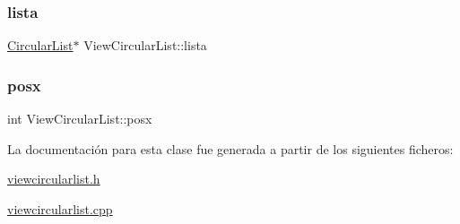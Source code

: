 \subsubsection{\texorpdfstring{lista}{lista}}
{\footnotesize\ttfamily \mbox{\hyperlink{class_circular_list}{Circular\+List}}$\ast$ View\+Circular\+List\+::lista}

\mbox{\label{class_view_circular_list_a9dca774f51b7b6bab8515b862774315f}} 
\subsubsection{\texorpdfstring{posx}{posx}}
{\footnotesize\ttfamily int View\+Circular\+List\+::posx}



La documentación para esta clase fue generada a partir de los siguientes ficheros\+:\begin{DoxyCompactItemize}
\item 
\mbox{\hyperlink{viewcircularlist_8h}{viewcircularlist.\+h}}\item 
\mbox{\hyperlink{viewcircularlist_8cpp}{viewcircularlist.\+cpp}}\end{DoxyCompactItemize}
